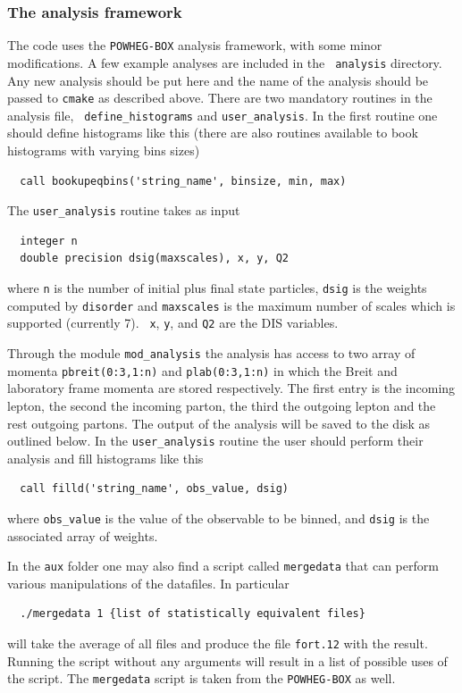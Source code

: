 \documentclass[submission, PhysCodeb]{SciPost}
\newcommand{\disorder}{{\tt disorder}}
\begin{document}
\subsubsection{The analysis framework}
The code uses the {\tt POWHEG-BOX} analysis framework, with some minor
modifications. A few example analyses are included in the {\tt
  analysis} directory. Any new analysis should be put here and the
name of the analysis should be passed to {\tt cmake} as described
above. There are two mandatory routines in the analysis file, {\tt
  define\_histograms} and {\tt user\_analysis}. In the first routine
one should define histograms like this (there are also routines
available to book histograms with varying bins sizes)
\begin{lstlisting}
  call bookupeqbins('string_name', binsize, min, max)
\end{lstlisting}
The {\tt user\_analysis} routine takes as input
\begin{lstlisting}
  integer n
  double precision dsig(maxscales), x, y, Q2
\end{lstlisting}
where {\tt n} is the number of initial plus final state particles,
{\tt dsig} is the weights computed by \disorder{} and {\tt maxscales}
is the maximum number of scales which is supported (currently 7). {\tt
  x}, {\tt y}, and {\tt Q2} are the DIS variables.

Through the module {\tt mod\_analysis} the analysis has access to two
array of momenta {\tt pbreit(0:3,1:n)} and {\tt plab(0:3,1:n)} in
which the Breit and laboratory frame momenta are stored
respectively. The first entry is the incoming lepton, the second the
incoming parton, the third the outgoing lepton and the rest outgoing
partons. The output of the analysis will be saved to the disk as
outlined below.  In the {\tt user\_analysis} routine the user should
perform their analysis and fill histograms like this
\begin{lstlisting}
  call filld('string_name', obs_value, dsig)
\end{lstlisting}
where {\tt obs\_value} is the value of the observable to be binned, and
{\tt dsig} is the associated array of weights. 

In the {\tt aux} folder one may also find a
script called {\tt mergedata} that can perform various manipulations
of the datafiles. In particular
\begin{lstlisting}
  ./mergedata 1 {list of statistically equivalent files}
\end{lstlisting}
will take the average of all files and produce the file {\tt fort.12}
with the result. Running the script without any arguments will result
in a list of possible uses of the script. The {\tt mergedata} script
is taken from the {\tt POWHEG-BOX} as well.
\end{document}
